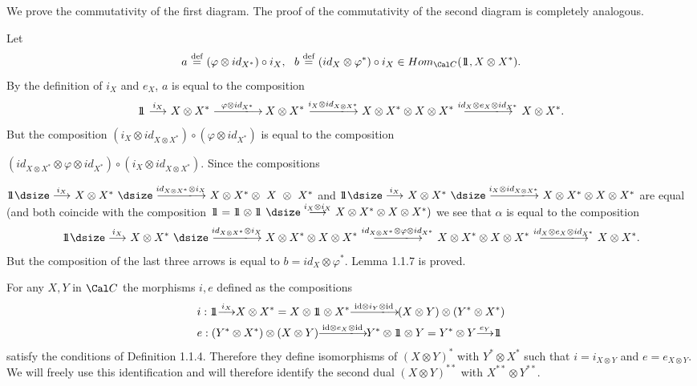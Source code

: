   We prove the commutativity of the first diagram.  The proof
of the commutativity of the second diagram is completely analogous.

Let
$$
a\ {\buildrel {\text{def}}\over =}\  (\varphi \otimes id_{X^*}) \circ
i_X,\ \ b\ {\buildrel {\text{def}}\over =}\  (id_{X} \otimes \varphi^*) \circ
i_X \in Hom_{{\Cal C}}(\ident, X \otimes X^*).
$$
By the definition of  $i_X$ and  $e_X$,   $a$ is equal to the
composition
$$
\ident\ {\buildrel{i_X}\over\longrightarrow}\ X \otimes X^*\
{\buildrel {\varphi \otimes id_{X^*}}\over\llongrightarrow}\ X \otimes X^*\
{\buildrel {i_X\otimes id_{X\otimes X^*}}\over\llongrightarrow}\
X \otimes X^* \otimes X \otimes X^*\
{\buildrel {id_X \otimes e_X \otimes id_{X^*}}\over\llongrightarrow}\
X \otimes X^*.
$$
But the composition  $(i_X \otimes id_{X\otimes X^*}) \circ
(\varphi \otimes id_{X^*})$  is equal to the composition

\noindent
$(id_{X\otimes X^*} \otimes \varphi \otimes id_{X^*}) \circ
(i_X \otimes id_{X\otimes X^*})$.  Since the compositions

\noindent
$\ident {\dsize\buildrel {i_X}\over\longrightarrow}\ X \otimes X^*\
{\dsize \buildrel {id_{X\otimes X^*} \otimes i_X}\over\llongrightarrow}\
X \otimes X^* \otimes~X~\otimes~X^*$ and
$\ident {\dsize\buildrel {i_X}\over\longrightarrow}\ X \otimes X^*\
{\dsize \buildrel {i_X \otimes id_{X\otimes X^*}}\over\llongrightarrow}\
X \otimes X^* \otimes X \otimes X^*$  are equal (and both coincide with
the composition $\ident = \ident \otimes \ident\
{\dsize\buildrel {i_X \otimes i_X}\over\longrightarrow}\ X \otimes X^* \otimes
X \otimes X^*)$  we see that  $\alpha$ is equal to the composition
$$
\ident {\dsize\buildrel {i_X}\over\longrightarrow}\ X \otimes X^*\
{\dsize \buildrel {id_{X\otimes X^*} \otimes i_X}\over\llongrightarrow}\
X \otimes X^* \otimes X \otimes X^*\
{\buildrel{id_{X\otimes X^*}\otimes\varphi\otimes
id_{X^*}}\over\llongrightarrow}\
X \otimes X^* \otimes X \otimes X^*\
{\buildrel {id_X \otimes e_X \otimes id_{X^*}}\over\llongrightarrow}\
X \otimes X^*.
$$
But the composition of the last three arrows is equal to $b = id_X \otimes
\varphi^*$. Lemma 1.1.7 is proved.
\enddemo

\subheading{1.1.8}   For any  $X,Y$ in ${\Cal C}$  the morphisms  $i,e$
defined as the compositions
$$
\aligned
&i: \ident {\buildrel {i_X}\over\longrightarrow} X \otimes X^* =
X \otimes \ident \otimes X^*
{\buildrel {\text{id}\otimes i_Y \otimes \text{id}}\over\llongrightarrow}
(X \otimes Y) \otimes (Y^* \otimes X^*)\\
& e: (Y^* \otimes X^*) \otimes (X \otimes Y)
{\buildrel {\text{id}\otimes e_X \otimes \text{id}}\over\llongrightarrow}
Y^* \otimes \ident \otimes Y = Y^* \otimes Y
{\buildrel {e_Y}\over\longrightarrow} \ident
\endaligned
$$
satisfy the conditions of Definition 1.1.4.  Therefore they define isomorphisms
of  $(X \otimes Y)^*$  with  $Y^* \otimes X^*$ such that $i = i_{X \otimes Y}$
and $e = e_{X \otimes Y}$.  We will
freely use this identification and will therefore identify the second dual
$(X \otimes Y)^{**}$  with  $X^{**} \otimes Y^{**}$.


